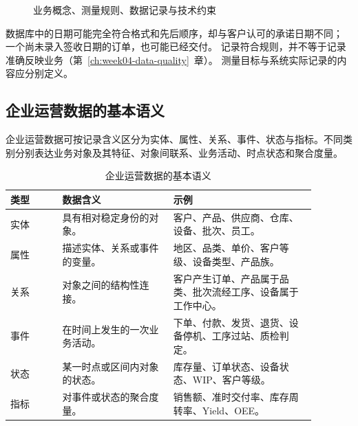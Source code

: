 \begin{figure}[htbp]
\centering
{}
\caption{业务概念、测量规则、数据记录与技术约束}
\label{fig:measurement-chain}
\end{figure}

数据库中的日期可能完全符合格式和先后顺序，却与客户认可的承诺日期不同；
一个尚未录入签收日期的订单，也可能已经交付。
记录符合规则，并不等于记录准确反映业务（第~\ref{ch:week04-data-quality}~章）。
测量目标与系统实际记录的内容应分别定义。
\subsection{企业运营数据的基本语义}

企业运营数据可按记录含义区分为实体、属性、关系、事件、状态与指标。不同类别分别表达业务对象及其特征、对象间联系、业务活动、时点状态和聚合度量。

\begin{table}[htbp]
\centering
\caption{企业运营数据的基本语义}
\begin{tabular}{P{0.15\linewidth}P{0.32\linewidth}P{0.41\linewidth}}
\toprule
{}
类型 & 数据含义 & 示例\\
\midrule

实体 & 具有相对稳定身份的对象。 & 客户、产品、供应商、仓库、设备、批次、员工。\\
属性 & 描述实体、关系或事件的变量。 & 地区、品类、单价、客户等级、设备类型、产品族。\\
关系 & 对象之间的结构性连接。 & 客户产生订单、产品属于品类、批次流经工序、设备属于工作中心。\\
事件 & 在时间上发生的一次业务活动。 & 下单、付款、发货、退货、设备停机、工序过站、质检判定。\\
状态 & 某一时点或区间内对象的状态。 & 库存量、订单状态、设备状态、WIP、客户等级。\\
指标 & 对事件或状态的聚合度量。 & 销售额、准时交付率、库存周转率、Yield、OEE。\\
\bottomrule
\end{tabular}
\end{table}

